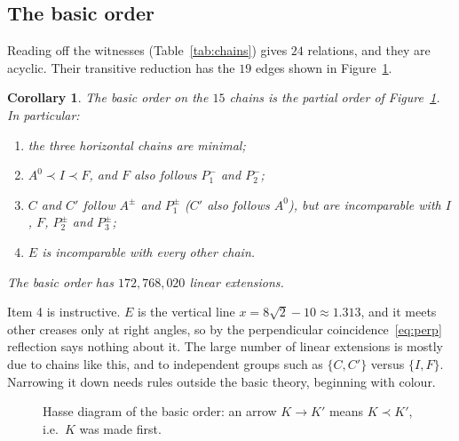 \documentclass[11pt]{article}
\newtheorem{corollary}[theorem]{Corollary}
\theoremstyle{definition}
\theoremstyle{remark}
\begin{document}
\subsection{The basic order}\label{sec:order}

Reading off the witnesses (Table~\ref{tab:chains}) gives $24$ relations, and they are acyclic. Their transitive reduction has the $19$ edges shown in Figure~\ref{fig:hasse}.

\begin{corollary}\label{cor:order}
The basic order on the $15$ chains is the partial order of Figure~\ref{fig:hasse}. In particular:
\begin{enumerate}
\item the three horizontal chains are minimal;
\item $A^{0}\prec I\prec F$, and $F$ also follows $P_1^{-}$ and $P_2^{-}$;
\item $C$ and $C'$ follow $A^{\pm}$ and $P_1^{\pm}$ ($C'$ also follows $A^0$), but are incomparable with $I$, $F$, $P_2^\pm$ and $P_3^\pm$;
\item $E$ is incomparable with every other chain.
\end{enumerate}
The basic order has $172{,}768{,}020$ linear extensions.
\end{corollary}

Item 4 is instructive. $E$ is the vertical line $x=8\sqrt2-10\approx1.313$, and it meets other creases only at right angles, so by the perpendicular coincidence~\eqref{eq:perp} reflection says nothing about it. The large number of linear extensions is mostly due to chains like this, and to independent groups such as $\{C,C'\}$ versus $\{I,F\}$. Narrowing it down needs rules outside the basic theory, beginning with colour.

\begin{figure}[t]
\centering
{}
\caption{Hasse diagram of the basic order: an arrow $K\to K'$ means $K\prec K'$, i.e.\ $K$ was made first.}
\label{fig:hasse}
\end{figure}
\end{document}
